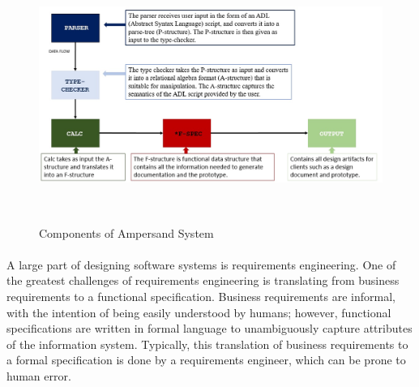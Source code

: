 \documentclass[12pt]{report}
\begin{document}
\begin{figure}[!htb]
\centering
\includegraphics[width=\textwidth]{../figures/ampersand_parts}
\caption{Components of Ampersand System}~\label{fig:AmpersandParts}
\end{figure}

\paragraph{}



A large part of designing software systems is requirements engineering. One
of the greatest challenges of requirements engineering is translating from
business requirements to a functional specification. Business requirements are
informal, with the intention of being easily understood by humans; however,
functional specifications are written in formal language to unambiguously 
capture attributes of the 
information system. Typically, this translation
of business requirements to a formal specification is done by a requirements
engineer, which can be prone to human error.
\end{document}
